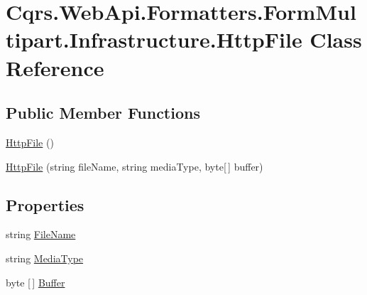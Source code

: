 \hypertarget{classCqrs_1_1WebApi_1_1Formatters_1_1FormMultipart_1_1Infrastructure_1_1HttpFile}{}\section{Cqrs.\+Web\+Api.\+Formatters.\+Form\+Multipart.\+Infrastructure.\+Http\+File Class Reference}
\label{classCqrs_1_1WebApi_1_1Formatters_1_1FormMultipart_1_1Infrastructure_1_1HttpFile}
\subsection*{Public Member Functions}
\begin{DoxyCompactItemize}
\item 
\hyperlink{classCqrs_1_1WebApi_1_1Formatters_1_1FormMultipart_1_1Infrastructure_1_1HttpFile_a27c8a6f375de51c5d5ff6d3602ab23c2}{Http\+File} ()
\item 
\hyperlink{classCqrs_1_1WebApi_1_1Formatters_1_1FormMultipart_1_1Infrastructure_1_1HttpFile_a725fbc81d5a60e8a85f4cf789907b934}{Http\+File} (string file\+Name, string media\+Type, byte\mbox{[}$\,$\mbox{]} buffer)
\end{DoxyCompactItemize}
\subsection*{Properties}
\begin{DoxyCompactItemize}
\item 
string \hyperlink{classCqrs_1_1WebApi_1_1Formatters_1_1FormMultipart_1_1Infrastructure_1_1HttpFile_a2cc7c6095e350040250f4f7160b05441}{File\+Name}
\item 
string \hyperlink{classCqrs_1_1WebApi_1_1Formatters_1_1FormMultipart_1_1Infrastructure_1_1HttpFile_a46f04eac1b1e5c8882622548912c481b}{Media\+Type}
\item 
byte \mbox{[}$\,$\mbox{]} \hyperlink{classCqrs_1_1WebApi_1_1Formatters_1_1FormMultipart_1_1Infrastructure_1_1HttpFile_a225694e4e77da8307f6c22d9cb33fbb0}{Buffer}
\end{DoxyCompactItemize}


